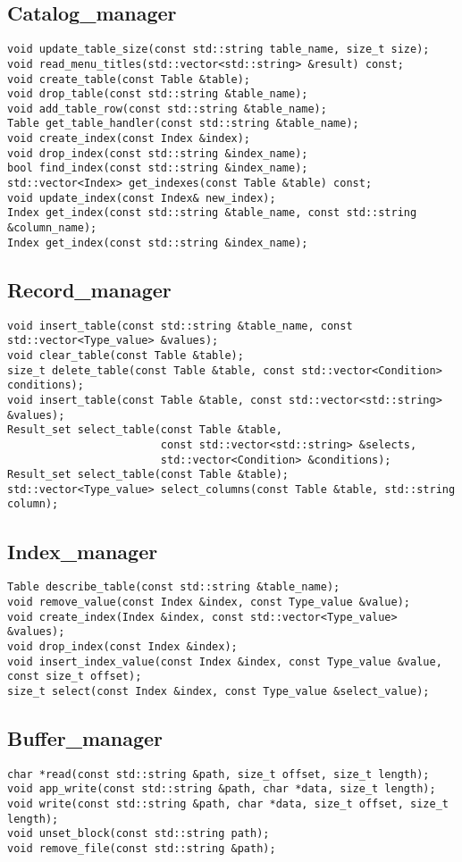 \documentclass[10pt]{article}
\begin{document}
\begin{CJK}{UTF8}{gkai}
\subsection{Catalog\_manager}
	\begin{lstlisting}
void update_table_size(const std::string table_name, size_t size);
void read_menu_titles(std::vector<std::string> &result) const;	
void create_table(const Table &table);	
void drop_table(const std::string &table_name);	
void add_table_row(const std::string &table_name);	
Table get_table_handler(const std::string &table_name);	
void create_index(const Index &index);	
void drop_index(const std::string &index_name);	
bool find_index(const std::string &index_name);	
std::vector<Index> get_indexes(const Table &table) const;	
void update_index(const Index& new_index);	
Index get_index(const std::string &table_name, const std::string &column_name);
Index get_index(const std::string &index_name);
	\end{lstlisting}
\subsection{Record\_manager}
	\begin{lstlisting}
void insert_table(const std::string &table_name, const std::vector<Type_value> &values);	
void clear_table(const Table &table);	
size_t delete_table(const Table &table, const std::vector<Condition> conditions);	
void insert_table(const Table &table, const std::vector<std::string> &values);	
Result_set select_table(const Table &table,
                        const std::vector<std::string> &selects,
                        std::vector<Condition> &conditions);	
Result_set select_table(const Table &table);	
std::vector<Type_value> select_columns(const Table &table, std::string column);	
	\end{lstlisting}
\subsection{Index\_manager}
\begin{lstlisting}
Table describe_table(const std::string &table_name);	
void remove_value(const Index &index, const Type_value &value);	
void create_index(Index &index, const std::vector<Type_value> &values);	
void drop_index(const Index &index);	
void insert_index_value(const Index &index, const Type_value &value, const size_t offset);
size_t select(const Index &index, const Type_value &select_value);	
\end{lstlisting}
\subsection{Buffer\_manager}
\begin{lstlisting}
char *read(const std::string &path, size_t offset, size_t length);	
void app_write(const std::string &path, char *data, size_t length);	
void write(const std::string &path, char *data, size_t offset, size_t length);	
void unset_block(const std::string path);	
void remove_file(const std::string &path);	
\end{lstlisting}


\end{CJK}
\end{document}

